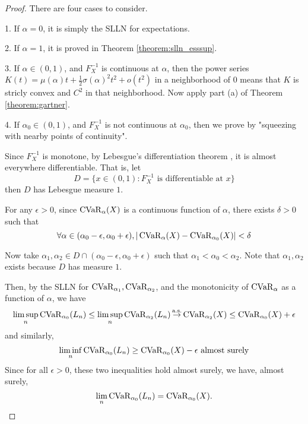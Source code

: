 \begin{proof} There are four cases to consider.
	
	1. If $\alpha = 0$, it is simply the SLLN for expectations.
	
	2. If $\alpha = 1$, it is proved in Theorem \ref{theorem:slln_esssup}.
	
	3. If $\alpha\in(0, 1)$, and $F_X^{-1}$ is continuous at $\alpha$, then the power series $K(t) = \mu(\alpha) t + \frac 12 \sigma(\alpha)^2 t^2 + o(t^2)$ in a neighborhood of $0$ means that $K$ is stricly convex and $C^2$ in that neighborhood. Now apply part (a) of Theorem \ref{theorem:gartner}.
	
	4. If $\alpha_0\in(0, 1)$, and $F_X^{-1}$ is not continuous at $\alpha_0$, then we prove by "squeezing with nearby points of continuity". 
	
	Since $F_X^{-1}$ is monotone, by Lebesgue's differentiation theorem \cite[Section 6.2]{roydenRealAnalysis2010}, it is almost everywhere differentiable. That is, let 
	$$D = \{x \in(0, 1): F_X^{-1} \text{ is differentiable at } x\}$$
	then $D$ has Lebesgue measure $1$.
	
	For any $\epsilon > 0$, since $\operatorname{CVaR}_\alpha(X)$ is a continuous function of $\alpha$, there exists $\delta > 0$ such that 
	$$\forall\alpha \in(\alpha_0 - \epsilon, \alpha_0  + \epsilon), 
	|\operatorname{CVaR}_\alpha(X) - \operatorname{CVaR}_{\alpha_0}(X)| < \delta$$
	
	Now take $\alpha_1, \alpha_2 \in D\cap (\alpha_0 - \epsilon, \alpha_0  + \epsilon)$ such that $\alpha_1 < \alpha_0 < \alpha_2$. Note that $\alpha_1, \alpha_2$ exists because $D$ has measure $1$. 
	
	Then, by the SLLN for $\operatorname{CVaR}_{\alpha_1}, \operatorname{CVaR}_{\alpha_2}$, and the monotonicity of $\operatorname{CVaR}_\alpha$ as a function of $\alpha$, we have 
	$$\limsup_n \operatorname{CVaR}_{\alpha_0}(L_n) 
	\le \limsup_n \operatorname{CVaR}_{\alpha_2}(L_n) \operatorname*{\stackrel{\text {a.s.}}{\rightarrow}} \operatorname{CVaR}_{\alpha_2}(X) 
	\le \operatorname{CVaR}_{\alpha_0}(X) + \epsilon$$
	and similarly, 
	$$
	\liminf_n \operatorname{CVaR}_{\alpha_0}(L_n) 
	\ge \operatorname{CVaR}_{\alpha_0}(X) - \epsilon \text{ almost surely}
	$$
	Since for all $\epsilon > 0$, these two inequalities hold almost surely, we have, almost surely,
	$$\lim_n \operatorname{CVaR}_{\alpha_0}(L_n) 
	= \operatorname{CVaR}_{\alpha_0}(X).$$
\end{proof}

